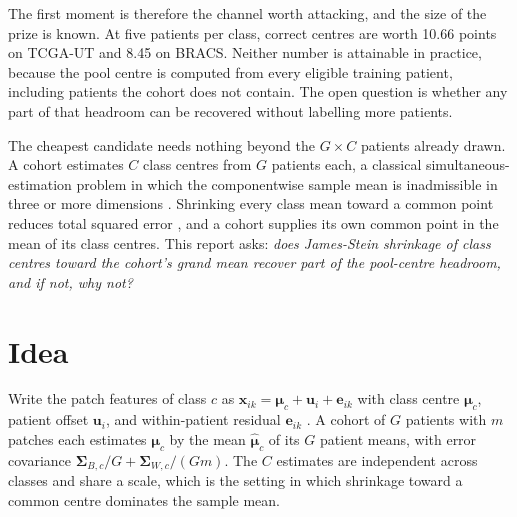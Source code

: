 \documentclass[11pt]{article}
\begin{document}
The first moment is therefore the channel worth attacking, and the size of the prize is known. At five patients per class, correct centres are worth 10.66 points on TCGA-UT and 8.45 on BRACS. Neither number is attainable in practice, because the pool centre is computed from every eligible training patient, including patients the cohort does not contain. The open question is whether any part of that headroom can be recovered without labelling more patients.

The cheapest candidate needs nothing beyond the $G \times C$ patients already drawn. A cohort estimates $C$ class centres from $G$ patients each, a classical simultaneous-estimation problem in which the componentwise sample mean is inadmissible in three or more dimensions \citep{stein1956}. Shrinking every class mean toward a common point reduces total squared error \citep{james1961,efron1975}, and a cohort supplies its own common point in the mean of its class centres. This report asks: \emph{does James-Stein shrinkage of class centres toward the cohort's grand mean recover part of the pool-centre headroom, and if not, why not?}

\section{Idea}
\label{sec:idea}
Write the patch features of class $c$ as $\mathbf x_{ik}=\boldsymbol\mu_c+\mathbf u_i+\mathbf e_{ik}$ with class centre $\boldsymbol\mu_c$, patient offset $\mathbf u_i$, and within-patient residual $\mathbf e_{ik}$ \citep{queisler2026centreError}. A cohort of $G$ patients with $m$ patches each estimates $\boldsymbol\mu_c$ by the mean $\hat{\boldsymbol\mu}_c$ of its $G$ patient means, with error covariance $\boldsymbol\Sigma_{B,c}/G+\boldsymbol\Sigma_{W,c}/(Gm)$. The $C$ estimates are independent across classes and share a scale, which is the setting in which shrinkage toward a common centre dominates the sample mean.
\end{document}
